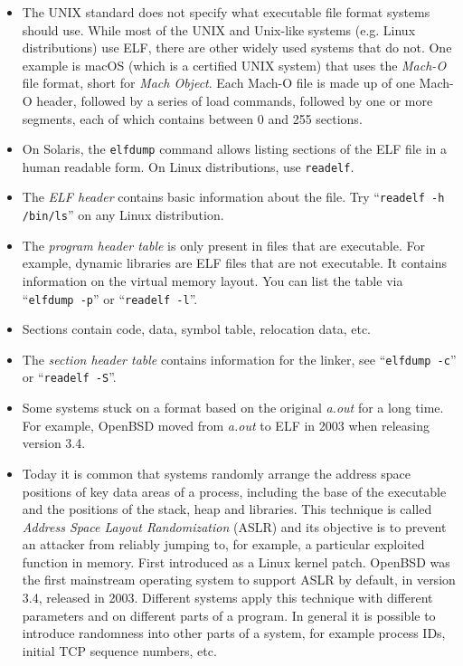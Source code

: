 \begin{itemize}
\item The UNIX standard does not specify what executable file format systems
should use.  While most of the UNIX and Unix-like systems (e.g. Linux
distributions) use ELF, there are other widely used systems that do not. One
example is macOS (which is a certified UNIX system) that uses the \emph{Mach-O}
file format, short for \emph{Mach Object}. Each Mach-O file is made
up of one Mach-O header, followed by a series of load commands, followed by one
or more segments, each of which contains between 0 and 255 sections.
\item On Solaris, the \texttt{elfdump} command allows listing sections of the
ELF file in a human readable form. On Linux distributions, use \texttt{readelf}.
\item The \emph{ELF header} contains basic information about the file.  Try
``\texttt{readelf -h /bin/ls}'' on any Linux distribution.
\item The \emph{program header table} is only present in files that are
executable.  For example, dynamic libraries are ELF files that are not
executable.  It contains information on the virtual memory layout.  You can list
the table via ``\texttt{elfdump~-p}'' or ``\texttt{readelf~-l}''.
\item Sections contain code, data, symbol table, relocation data, etc.
\item The \emph{section header table} contains information for the linker, see
``\texttt{elfdump -c}'' or ``\texttt{readelf~-S}''.
\item Some systems stuck on a format based on the original \emph{a.out} for a
long time.  For example, OpenBSD moved from \emph{a.out} to ELF in 2003 when
releasing version 3.4.
\item Today it is common that systems randomly arrange the address space
positions of key data areas of a process, including the base of the executable
and the positions of the stack, heap and libraries.  This technique is called
\emph{Address Space Layout Randomization} (ASLR) and its objective is to prevent
an attacker from reliably jumping to, for example, a particular exploited
function in memory.  First introduced as a Linux kernel patch.  OpenBSD was the
first mainstream operating system to support ASLR by default, in version 3.4,
released in 2003.  Different systems apply this technique with different
parameters and on different parts of a program.  In general it is possible to
introduce randomness into other parts of a system, for example process IDs,
initial TCP sequence numbers, etc.
\end{itemize}

